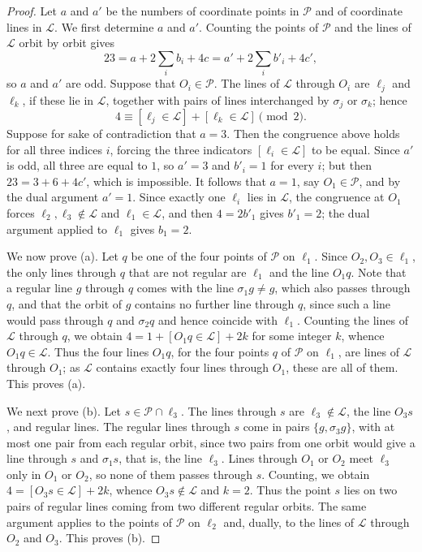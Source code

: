 \documentclass[11pt]{article}
\theoremstyle{plain}
\theoremstyle{definition}
\newcommand{\cP}{\mathcal{P}}
\newcommand{\cL}{\mathcal{L}}
\begin{document}
\begin{proof}
Let $a$ and $a'$ be the numbers of coordinate points in $\cP$ and of coordinate lines in $\cL$.  We first determine $a$ and $a'$.  Counting the points of $\cP$ and the lines of $\cL$ orbit by orbit gives
\[
23=a+2\sum_i b_i+4c=a'+2\sum_i b'_i+4c',
\]
so $a$ and $a'$ are odd.  Suppose that $O_i\in\cP$.  The lines of $\cL$ through $O_i$ are $\ell_j$ and $\ell_k$, if these lie in $\cL$, together with pairs of lines interchanged by $\sigma_j$ or $\sigma_k$; hence
\[
4\equiv[\ell_j\in\cL]+[\ell_k\in\cL]\pmod 2 .
\]
Suppose for sake of contradiction that $a=3$.  Then the congruence above holds for all three indices $i$, forcing the three indicators $[\ell_i\in\cL]$ to be equal.  Since $a'$ is odd, all three are equal to $1$, so $a'=3$ and $b'_i=1$ for every $i$; but then $23=3+6+4c'$, which is impossible.  It follows that $a=1$, say $O_1\in\cP$, and by the dual argument $a'=1$.  Since exactly one $\ell_i$ lies in $\cL$, the congruence at $O_1$ forces $\ell_2,\ell_3\notin\cL$ and $\ell_1\in\cL$, and then $4=2b'_1$ gives $b'_1=2$; the dual argument applied to $\ell_1$ gives $b_1=2$.

We now prove (a).  Let $q$ be one of the four points of $\cP$ on $\ell_1$.  Since $O_2,O_3\in\ell_1$, the only lines through $q$ that are not regular are $\ell_1$ and the line $O_1q$.  Note that a regular line $g$ through $q$ comes with the line $\sigma_1g\ne g$, which also passes through $q$, and that the orbit of $g$ contains no further line through $q$, since such a line would pass through $q$ and $\sigma_2q$ and hence coincide with $\ell_1$.  Counting the lines of $\cL$ through $q$, we obtain $4=1+[O_1q\in\cL]+2k$ for some integer $k$, whence $O_1q\in\cL$.  Thus the four lines $O_1q$, for the four points $q$ of $\cP$ on $\ell_1$, are lines of $\cL$ through $O_1$; as $\cL$ contains exactly four lines through $O_1$, these are all of them.  This proves (a).

We next prove (b).  Let $s\in\cP\cap\ell_3$.  The lines through $s$ are $\ell_3\notin\cL$, the line $O_3s$, and regular lines.  The regular lines through $s$ come in pairs $\{g,\sigma_3g\}$, with at most one pair from each regular orbit, since two pairs from one orbit would give a line through $s$ and $\sigma_1s$, that is, the line $\ell_3$.  Lines through $O_1$ or $O_2$ meet $\ell_3$ only in $O_1$ or $O_2$, so none of them passes through $s$.  Counting, we obtain $4=[O_3s\in\cL]+2k$, whence $O_3s\notin\cL$ and $k=2$.  Thus the point $s$ lies on two pairs of regular lines coming from two different regular orbits.  The same argument applies to the points of $\cP$ on $\ell_2$ and, dually, to the lines of $\cL$ through $O_2$ and $O_3$.  This proves (b).


\end{proof}
\end{document}
